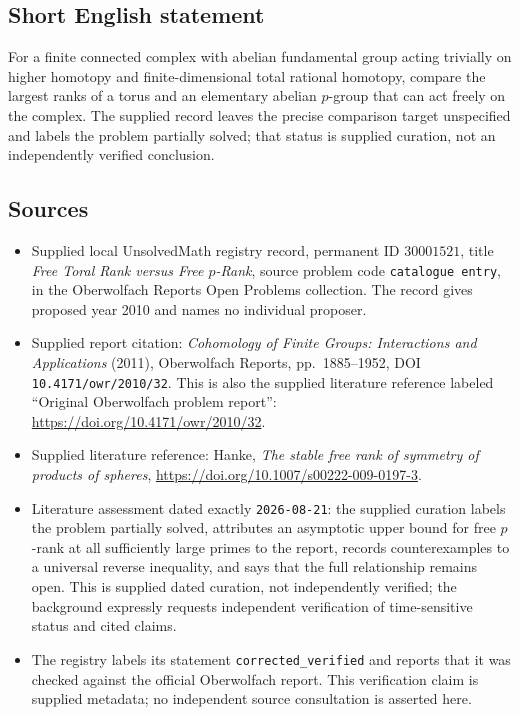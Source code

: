 \documentclass[11pt]{article}
\begin{document}
\subsection{Short English statement}
For a finite connected complex with abelian fundamental group acting trivially on higher homotopy and finite-dimensional total rational homotopy, compare the largest ranks of a torus and an elementary abelian \(p\)-group that can act freely on the complex. The supplied record leaves the precise comparison target unspecified and labels the problem partially solved; that status is supplied curation, not an independently verified conclusion.
\subsection{Sources}
\begin{itemize}
\item Supplied local UnsolvedMath registry record, permanent ID \(30001521\), title \emph{Free Toral Rank versus Free \(p\)-Rank}, source problem code \texttt{catalogue entry}, in the Oberwolfach Reports Open Problems collection. The record gives proposed year 2010 and names no individual proposer.
\item Supplied report citation: \emph{Cohomology of Finite Groups: Interactions and Applications} (2011), Oberwolfach Reports, pp.\ 1885--1952, DOI \texttt{10.4171/owr/2010/32}. This is also the supplied literature reference labeled ``Original Oberwolfach problem report'': \url{https://doi.org/10.4171/owr/2010/32}.
\item Supplied literature reference: Hanke, \emph{The stable free rank of symmetry of products of spheres}, \url{https://doi.org/10.1007/s00222-009-0197-3}.
\item Literature assessment dated exactly \texttt{2026-08-21}: the supplied curation labels the problem partially solved, attributes an asymptotic upper bound for free \(p\)-rank at all sufficiently large primes to the report, records counterexamples to a universal reverse inequality, and says that the full relationship remains open. This is supplied dated curation, not independently verified; the background expressly requests independent verification of time-sensitive status and cited claims.
\item The registry labels its statement \texttt{corrected\_verified} and reports that it was checked against the official Oberwolfach report. This verification claim is supplied metadata; no independent source consultation is asserted here.
\end{itemize}
\end{document}
